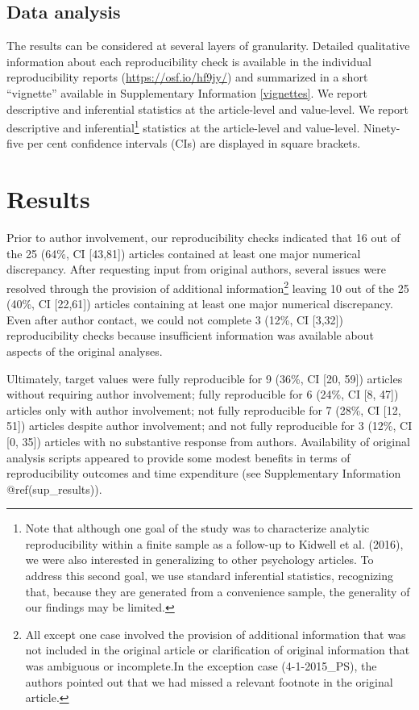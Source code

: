 \documentclass[english,,man,floatsintext]{apa6}
\begin{document}
\hypertarget{data-analysis}{%
\subsection{Data analysis}\label{data-analysis}}

The results can be considered at several layers of granularity. Detailed qualitative information about each reproducibility check is available in the individual reproducibility reports (\url{https://osf.io/hf9jy/}) and summarized in a short \enquote{vignette} available in Supplementary Information \ref{vignettes}. We report descriptive and inferential statistics at the article-level and value-level. We report descriptive and inferential\footnote{Note that although one goal of the study was to characterize analytic reproducibility within a finite sample as a follow-up to Kidwell et al. (2016), we were also interested in generalizing to other psychology articles. To address this second goal, we use standard inferential statistics, recognizing that, because they are generated from a convenience sample, the generality of our findings may be limited.} statistics at the article-level and value-level. Ninety-five per cent confidence intervals (CIs) are displayed in square brackets.

\hypertarget{results}{%
\section{Results}\label{results}}

Prior to author involvement, our reproducibility checks indicated that 16 out of the 25 (64\%, CI {[}43,81{]}) articles contained at least one major numerical discrepancy. After requesting input from original authors, several issues were resolved through the provision of additional information\footnote{All except one case involved the provision of additional information that was not included in the original article or clarification of original information that was ambiguous or incomplete.In the exception case (4-1-2015\_PS), the authors pointed out that we had missed a relevant footnote in the original article.} leaving 10 out of the 25 (40\%, CI {[}22,61{]}) articles containing at least one major numerical discrepancy. Even after author contact, we could not complete 3 (12\%, CI {[}3,32{]}) reproducibility checks because insufficient information was available about aspects of the original analyses.

Ultimately, target values were fully reproducible for 9 (36\%, CI {[}20, 59{]}) articles without requiring author involvement; fully reproducible for 6 (24\%, CI {[}8, 47{]}) articles only with author involvement; not fully reproducible for 7 (28\%, CI {[}12, 51{]}) articles despite author involvement; and not fully reproducible for 3 (12\%, CI {[}0, 35{]}) articles with no substantive response from authors. Availability of original analysis scripts appeared to provide some modest benefits in terms of reproducibility outcomes and time expenditure (see Supplementary Information @ref(sup\_results)).
\end{document}
